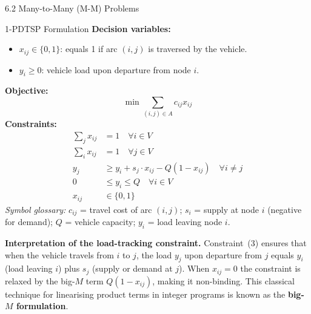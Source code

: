 \documentclass[aspectratio=169,10pt]{beamer}
\begin{document}
\begin{frame}[allowframebreaks]{6.2 Many-to-Many (M-M) Problems}
  \begin{block}{1-PDTSP Formulation}
    \textbf{Decision variables:}
    \begin{itemize}
      \item $x_{ij} \in \{0,1\}$: equals 1 if arc $(i,j)$ is traversed by the vehicle.
      \item $y_i \geq 0$: vehicle load upon departure from node $i$.
    \end{itemize}
    \textbf{Objective:}
    \[
      \min \sum_{(i,j) \in A} c_{ij} x_{ij}
    \]
    \textbf{Constraints:}
    \begin{align}
      \sum_{j} x_{ij} &= 1 \quad \forall i \in V \tag{1: each node left once} \\
      \sum_{i} x_{ij} &= 1 \quad \forall j \in V \tag{2: each node entered once} \\
      y_j &\geq y_i + s_j \cdot x_{ij} - Q(1 - x_{ij}) \quad \forall i \neq j
            \tag{3: load tracking} \\
      0 &\leq y_i \leq Q \quad \forall i \in V \tag{4: capacity} \\
      x_{ij} &\in \{0,1\} \tag{5: binary}
    \end{align}
    \emph{Symbol glossary:} $c_{ij}$ = travel cost of arc $(i,j)$; $s_i$ = supply at
    node $i$ (negative for demand); $Q$ = vehicle capacity; $y_i$ = load leaving node $i$.
  \end{block}

  \framebreak

  \textbf{Interpretation of the load-tracking constraint.} Constraint~(3) ensures that
  when the vehicle travels from $i$ to $j$, the load $y_j$ upon departure from $j$ equals
  $y_i$ (load leaving $i$) plus $s_j$ (supply or demand at $j$).  When $x_{ij} = 0$ the
  constraint is relaxed by the big-$M$ term $Q(1-x_{ij})$, making it non-binding.  This
  classical technique for linearising product terms in integer programs is known as the
  \textbf{big-$M$ formulation}.


\end{frame}
\end{document}
